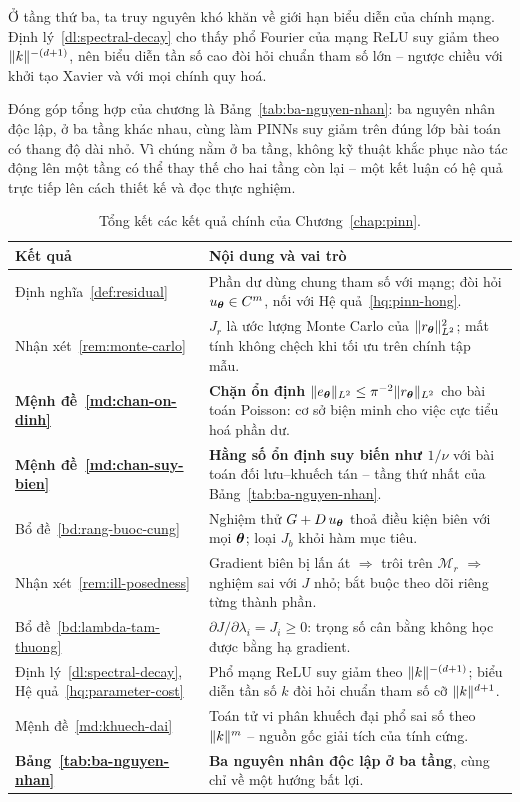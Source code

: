 Ở tầng thứ ba, ta truy nguyên khó khăn về giới hạn biểu diễn của chính mạng.
Định lý~\ref{dl:spectral-decay} cho thấy phổ Fourier của mạng ReLU suy giảm theo
$\lVert k\rVert^{-(d+1)}$, nên biểu diễn tần số cao đòi hỏi chuẩn tham số lớn -- ngược
chiều với khởi tạo Xavier và với mọi chính quy hoá.
 
Đóng góp tổng hợp của chương là Bảng~\ref{tab:ba-nguyen-nhan}: ba nguyên nhân độc
lập, ở ba tầng khác nhau, cùng làm PINNs suy giảm trên đúng lớp bài toán có thang
độ dài nhỏ. Vì chúng nằm ở ba tầng, không kỹ thuật khắc phục nào tác động lên một
tầng có thể thay thế cho hai tầng còn lại -- một kết luận có hệ quả trực tiếp lên
cách thiết kế và đọc thực nghiệm.
 
\begin{table}[htbp]
\centering
\caption{Tổng kết các kết quả chính của Chương~\ref{chap:pinn}.}
\label{tab:tong-ket-4}
\small
\begin{tabular}{@{}l p{8.2cm}@{}}
\toprule
\textbf{Kết quả} & \textbf{Nội dung và vai trò} \\
\midrule
Định nghĩa~\ref{def:residual}
  & Phần dư dùng chung tham số với mạng; đòi hỏi $u_{\bm{\theta}}\in C^m$, nối với
    Hệ quả~\ref{hq:pinn-hong}. \\
Nhận xét~\ref{rem:monte-carlo}
  & $J_r$ là ước lượng Monte Carlo của $\lVert r_{\bm{\theta}}\rVert_{L^2}^2$; mất tính
    không chệch khi tối ưu trên chính tập mẫu. \\
\textbf{Mệnh đề~\ref{md:chan-on-dinh}}
  & \textbf{Chặn ổn định} $\lVert e_{\bm{\theta}}\rVert_{L^2}\le \pi^{-2}
    \lVert r_{\bm{\theta}}\rVert_{L^2}$ cho bài toán Poisson: cơ sở biện minh cho việc cực
    tiểu hoá phần dư. \\
\textbf{Mệnh đề~\ref{md:chan-suy-bien}}
  & \textbf{Hằng số ổn định suy biến như $1/\nu$} với bài toán đối lưu--khuếch
    tán -- tầng thứ nhất của Bảng~\ref{tab:ba-nguyen-nhan}. \\
Bổ đề~\ref{bd:rang-buoc-cung}
  & Nghiệm thử $G + D\,u_{\bm{\theta}}$ thoả điều kiện biên với mọi $\bm{\theta}$; loại
    $J_b$ khỏi hàm mục tiêu. \\
Nhận xét~\ref{rem:ill-posedness}
  & Gradient biên bị lấn át $\Rightarrow$ trôi trên $\mathcal{M}_r$ $\Rightarrow$
    nghiệm sai với $J$ nhỏ; bắt buộc theo dõi riêng từng thành phần. \\
Bổ đề~\ref{bd:lambda-tam-thuong}
  & $\partial J/\partial\lambda_i = J_i \ge 0$: trọng số cân bằng không học được
    bằng hạ gradient. \\
Định lý~\ref{dl:spectral-decay}, Hệ quả~\ref{hq:parameter-cost}
  & Phổ mạng ReLU suy giảm theo $\lVert k\rVert^{-(d+1)}$; biểu diễn tần số $k$ đòi hỏi
    chuẩn tham số cỡ $\lVert k\rVert^{d+1}$. \\
Mệnh đề~\ref{md:khuech-dai}
  & Toán tử vi phân khuếch đại phổ sai số theo $\lVert k\rVert^{m}$ -- nguồn gốc giải
    tích của tính cứng. \\
\textbf{Bảng~\ref{tab:ba-nguyen-nhan}}
  & \textbf{Ba nguyên nhân độc lập ở ba tầng}, cùng chỉ về một hướng bất lợi. \\
\bottomrule
\end{tabular}
\end{table}
 
